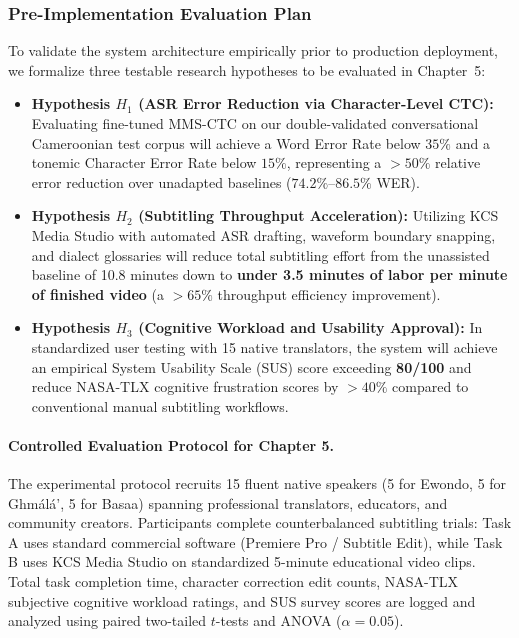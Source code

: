 \documentclass[conference]{IEEEtran}
\begin{document}
\subsubsection{Pre-Implementation Evaluation Plan}
\label{sec:design:gov:evalplan}
To validate the system architecture empirically prior to production deployment, we formalize three testable research hypotheses to be evaluated in Chapter~5:
\begin{itemize}
    \item \textbf{Hypothesis $H_1$ (ASR Error Reduction via Character-Level CTC):} Evaluating fine-tuned MMS-CTC on our double-validated conversational Cameroonian test corpus will achieve a Word Error Rate below $35\%$ and a tonemic Character Error Rate below $15\%$, representing a $>50\%$ relative error reduction over unadapted baselines ($74.2\%\text{--}86.5\%$ WER).
    \item \textbf{Hypothesis $H_2$ (Subtitling Throughput Acceleration):} Utilizing KCS Media Studio with automated ASR drafting, waveform boundary snapping, and dialect glossaries will reduce total subtitling effort from the unassisted baseline of 10.8 minutes down to \textbf{under 3.5 minutes of labor per minute of finished video} (a $>65\%$ throughput efficiency improvement).
    \item \textbf{Hypothesis $H_3$ (Cognitive Workload and Usability Approval):} In standardized user testing with 15 native translators, the system will achieve an empirical System Usability Scale (SUS) score exceeding \textbf{80/100} and reduce NASA-TLX cognitive frustration scores by $>40\%$ compared to conventional manual subtitling workflows.
\end{itemize}

\paragraph{Controlled Evaluation Protocol for Chapter 5.}
The experimental protocol recruits 15 fluent native speakers (5 for Ewondo, 5 for Gh\textopeno m\'al\'a', 5 for Basaa) spanning professional translators, educators, and community creators. Participants complete counterbalanced subtitling trials: Task A uses standard commercial software (Premiere Pro / Subtitle Edit), while Task B uses KCS Media Studio on standardized 5-minute educational video clips. Total task completion time, character correction edit counts, NASA-TLX subjective cognitive workload ratings, and SUS survey scores are logged and analyzed using paired two-tailed $t$-tests and ANOVA ($\alpha = 0.05$).
\end{document}
